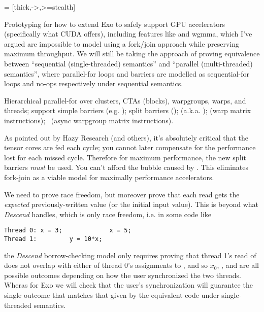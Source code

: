 

 = [thick,->,>=stealth]



Prototyping for how to extend Exo to safely support GPU accelerators (specifically what CUDA offers), including features like  and wgmma, which I've argued are impossible to model using a fork/join approach while preserving maximum throughput. We will still be taking the approach of proving equivalence between ``sequential (single-threaded) semantics'' and ``parallel (multi-threaded) semantics'', where parallel-for loops and barriers are modelled as sequential-for loops and no-ops respectively under sequential semantics.


 Hierarchical parallel-for over clusters, CTAs (blocks), warpgroups, warps, and threads; support simple barriers (e.g. ); split barriers (\mbarrier);  (a.k.a. );  (warp matrix instructions); \wgmma\ (async warpgroup matrix instructions).

\filbreak
{} As pointed out by Hazy Research (and others), it's absolutely critical that the tensor cores are fed each cycle; you cannot later compensate for the performance lost for each missed cycle. Therefore for maximum performance, the new split barriers \textit{must} be used. You can't afford the bubble caused by . This eliminates fork-join as a viable model for maximally performance accelerators.

\filbreak
{} We need to prove race freedom, but moreover prove that each read gets the \textit{expected} previously-written value (or the initial input value). This is beyond what \textit{Descend} handles, which is only race freedom, i.e. in some code like

{\color{lightttColor}
\begin{verbatim}
Thread 0: x = 3;             x = 5;
Thread 1:         y = 10*x;
\end{verbatim}
}

the \textit{Descend} borrow-checking model only requires proving that thread 1's read of  does not overlap with either of thread 0's assignments to , and so $x_0$, , and  are all possible outcomes depending on how the user synchronized the two threads. Wheras for Exo we will check that the user's synchronization will guarantee the single outcome that matches that given by the equivalent code under single-threaded semantics.

